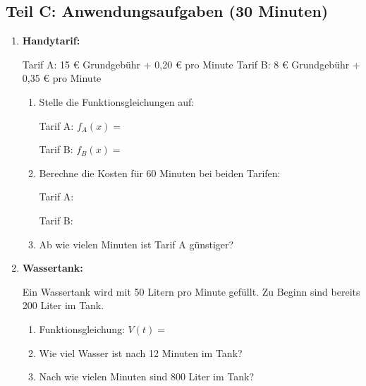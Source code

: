 \subsection*{Teil C: Anwendungsaufgaben (30 Minuten)}

\begin{enumerate}[label=\arabic*.,resume]

    \item \textbf{Handytarif:}

    Tarif A: 15 € Grundgebühr + 0,20 € pro Minute
    Tarif B: 8 € Grundgebühr + 0,35 € pro Minute

    \begin{enumerate}[label=\alph*)]
        \item Stelle die Funktionsgleichungen auf:

        Tarif A: $f_A(x) = $ \underline{\hspace{6cm}}

        Tarif B: $f_B(x) = $ \underline{\hspace{6cm}}

        \vspace{0.5cm}

        \item Berechne die Kosten für 60 Minuten bei beiden Tarifen:

        Tarif A: \underline{\hspace{6cm}}

        Tarif B: \underline{\hspace{6cm}}

        \vspace{0.5cm}

        \item Ab wie vielen Minuten ist Tarif A günstiger?

        \vspace{2cm}

    \end{enumerate}

    \item \textbf{Wassertank:}

    Ein Wassertank wird mit 50 Litern pro Minute gefüllt. Zu Beginn sind bereits 200 Liter im Tank.

    \begin{enumerate}[label=\alph*)]
        \item Funktionsgleichung: $V(t) = $ \underline{\hspace{6cm}}

        \item Wie viel Wasser ist nach 12 Minuten im Tank?

        \vspace{1.5cm}

        \item Nach wie vielen Minuten sind 800 Liter im Tank?

        \vspace{1.5cm}

    \end{enumerate}

\end{enumerate}